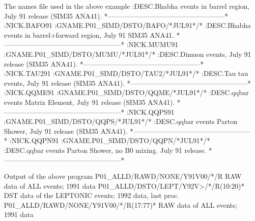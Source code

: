 \begin{XMPt}{The names file used in the above example}
:DESC.Bhabha events in barrel region, July 91 release (SIM35 ANA41).    
*---------------------------------------------------*                   
:NICK.BAFO91                                                            
:GNAME.P01_SIMD/DSTO/BAFO/*JUL91*/*                                     
:DESC.Bhabha events in barrel+forward region, July 91 SIM35 ANA41.      
*---------------------------------------------------*                   
:NICK.MUMU91                                                            
:GNAME.P01_SIMD/DSTO/MUMU/*JUL91*/*                                     
:DESC.Dimuon events, July 91 release (SIM35 ANA41).                     
*---------------------------------------------------*                   
:NICK.TAU291                                                            
:GNAME.P01_SIMD/DSTO/TAU2/*JUL91*/*                                     
:DESC.Tau tau events, July 91 release (SIM35 ANA41).                    
*---------------------------------------------------*                   
:NICK.QQME91                                                            
:GNAME.P01_SIMD/DSTO/QQME/*JUL91*/*                                     
:DESC.qqbar events Matrix Element, July 91 release (SIM35 ANA41).       
*---------------------------------------------------*                   
:NICK.QQPS91                                                            
:GNAME.P01_SIMD/DSTO/QQPS/*JUL91*/*                                     
:DESC.qqbar events Parton Shower, July 91 release (SIM35 ANA41).        
*---------------------------------------------------*                   
:NICK.QQPN91                                                            
:GNAME.P01_SIMD/DSTO/QQPN/*JUL91*/*                                     
:DESC.qqbar events Parton Shower, no B0 mixing. July 91 release.        
*---------------------------------------------------*                   
\end{XMPt}

\begin{XMPt}{Output of the above program}
 P01_ALLD/RAWD/NONE/Y91V00/*/R
 RAW data of ALL events; 1991 data
 P01_ALLD/DSTO/LEPT/Y92V>/*/R(10:20)*
 DST data of the LEPTONIC events; 1992 data, last proc.
 P01_ALLD/RAWD/NONE/Y91V00/*/R(17:77)*
 RAW data of ALL events; 1991 data
\end{XMPt}

